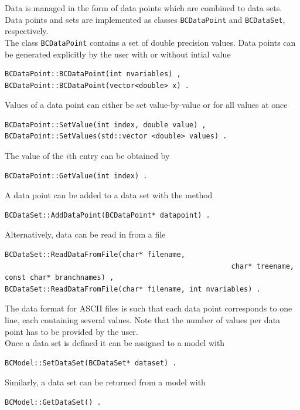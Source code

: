 \documentclass[11pt, a4paper]{article}
\begin{document}
Data is managed in the form of data points which are combined to data
sets. Data points and sets are implemented as classes
\verb|BCDataPoint| and \verb|BCDataSet|, respectively. \\ 

\noindent 
The class \verb|BCDataPoint| contains a set of double precision
values. Data points can be generated explicitly by the user with or
without intial value
%
\begin{verbatim} 
BCDataPoint::BCDataPoint(int nvariables) ,
BCDataPoint::BCDataPoint(vector<double> x) .  
\end{verbatim} 

\noindent 
Values of a data point can either be set value-by-value or for all
values at once
%
\begin{verbatim} 
BCDataPoint::SetValue(int index, double value) , 
BCDataPoint::SetValues(std::vector <double> values) . 
\end{verbatim} 

\noindent 
The value of the $i$th entry can be obtained by 
%
\begin{verbatim}
BCDataPoint::GetValue(int index) . 
\end{verbatim} 

\noindent 
A data point can be added to a data set with the method

\begin{verbatim} 
BCDataSet::AddDataPoint(BCDataPoint* datapoint) . 
\end{verbatim} 

\noindent 
Alternatively, data can be read in from a file
%
\begin{verbatim}
BCDataSet::ReadDataFromFile(char* filename, 
													  char* treename, const char* branchnames) ,
BCDataSet::ReadDataFromFile(char* filename, int nvariables) .
\end{verbatim} 

\noindent 
The data format for ASCII files is such that each data point
corresponds to one line, each containing several values. Note that the
number of values per data point has to be provided by the user. \\

\noindent 
Once a data set is defined it can be assigned to a model with
%
\begin{verbatim}
BCModel::SetDataSet(BCDataSet* dataset) . 
\end{verbatim} 

\noindent 
Similarly, a data set can be returned from a model with 
%
\begin{verbatim}
BCModel::GetDataSet() . 
\end{verbatim} 
\end{document}

